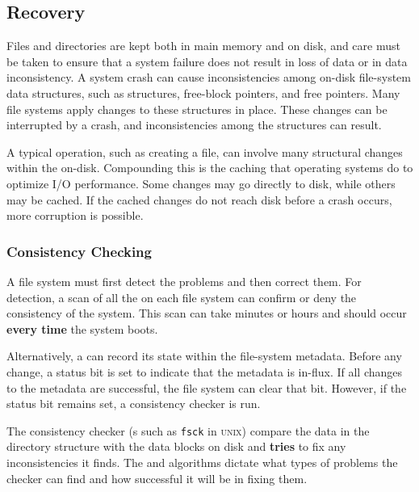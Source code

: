 \subsection{Recovery}\label{subsec:Recovery}
Files and directories are kept both in main memory and on disk, and care must be taken to ensure that a system failure does not result in loss of data or in data inconsistency.
A system crash can cause inconsistencies among on-disk file-system data structures, such as  structures, free-block pointers, and free  pointers.
Many file systems apply changes to these structures in place.
These changes can be interrupted by a crash, and inconsistencies among the structures can result.

A typical operation, such as creating a file, can involve many structural changes within the  on-disk.
Compounding this is the caching that operating systems do to optimize I/O performance.
Some changes may go directly to disk, while others may be cached.
If the cached changes do not reach disk before a crash occurs, more corruption is possible.

\subsubsection{Consistency Checking}\label{subsubsec:Consistency_Checking}
A file system must first detect the problems and then correct them.
For detection, a scan of all the  on each file system can confirm or deny the consistency of the system.
This scan can take minutes or hours and should occur \textbf{every time} the system boots.

Alternatively, a  can record its state within the file-system metadata.
Before any  change, a status bit is set to indicate that the metadata is in-flux.
If all changes to the metadata are successful, the file system can clear that bit.
However, if the status bit remains set, a consistency checker is run.

The consistency checker (s such as \texttt{fsck} in \textsc{unix}) compare the data in the directory structure with the data blocks on disk and \textbf{tries} to fix any inconsistencies it finds.
The  and  algorithms dictate what types of problems the checker can find and how successful it will be in fixing them.

